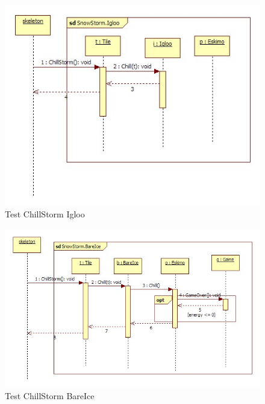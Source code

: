 \begin{figure}[h]
	\begin{center}
		\includegraphics[width=17cm]{chapters/chapter05/diagrams/Test_ChillStorm_Igloo.jpg}
		\caption{Test ChillStorm Igloo}
		\label{fig:Test ChillStorm Igloo}
	\end{center}
\end{figure}

\begin{figure}[h]
	\begin{center}
		\includegraphics[width=17cm]{chapters/chapter05/diagrams/Test_ChillStorm_BareIce.jpg}
		\caption{Test ChillStorm BareIce}
		\label{fig:Test ChillStorm BareIce}
	\end{center}
\end{figure}



